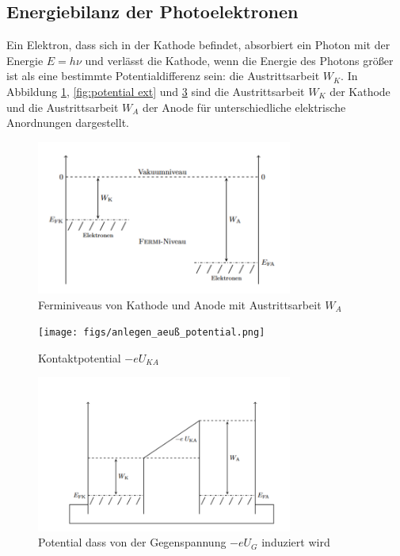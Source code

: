 
\subsection{Energiebilanz der Photoelektronen}
Ein Elektron, dass sich in der Kathode befindet, absorbiert ein Photon mit der Energie $E = h\nu$ und verlässt die Kathode, wenn die Energie des Photons größer ist als eine bestimmte Potentialdifferenz sein: die Austrittsarbeit $W_K$.
In Abbildung \ref{fig:kathode-anode}, \ref{fig:potential ext} und \ref{fig:potential kurzg.} sind die Austrittsarbeit $W_K$ der Kathode und die Austrittsarbeit $W_A$ der Anode für unterschiedliche elektrische Anordnungen dargestellt.\\ %

\begin{figure}[htbp]
    \centering
    \includegraphics[width=0.75\textwidth]{figs/baenderschema_kathode_anode.png}
    \caption{ Ferminiveaus von Kathode und Anode mit Austrittsarbeit $W_A$ \cite{praktikum}}
    \label{fig:kathode-anode}
\end{figure}
\FloatBarrier

\begin{figure}[htbp]
    \centering
    \texttt{[image: figs/anlegen\_aeuß\_potential.png]}
    \caption{ Kontaktpotential $-eU_{KA}$ \cite{praktikum}}
    \label{fig:potential_ext}
\end{figure}
\FloatBarrier

\begin{figure}[htbp]
    \centering
    \includegraphics[width=0.75\textwidth]{figs/kontaktpotential_kurzgeschl_elektroden.png}
    \caption{  Potential dass von der Gegenspannung
$-eU_G$ induziert wird\cite{praktikum}}
    \label{fig:potential kurzg.}
\end{figure}
\FloatBarrier

